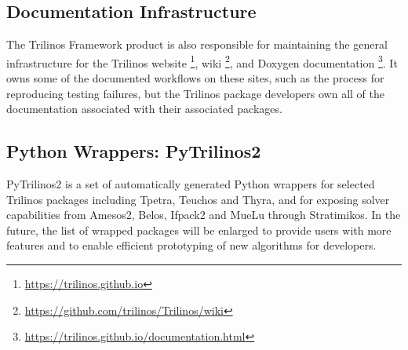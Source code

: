 \subsection{Documentation Infrastructure}

The Trilinos Framework product is also responsible for maintaining the general infrastructure for the Trilinos website \footnote{\url{https://trilinos.github.io}}, wiki \footnote{\url{https://github.com/trilinos/Trilinos/wiki}}, and Doxygen documentation \footnote{\url{https://trilinos.github.io/documentation.html}}. It owns some of the documented workflows on these sites, such as the process for reproducing testing failures, but the Trilinos package developers own all of the documentation associated with their associated packages.


\subsection{Python Wrappers: PyTrilinos2}

PyTrilinos2 is a set of automatically generated Python wrappers for selected Trilinos packages including Tpetra, Teuchos and Thyra, and for exposing solver capabilities from Amesos2, Belos, Ifpack2 and MueLu through Stratimikos. In the future, the list of wrapped packages will be enlarged to provide users with more features and to enable efficient prototyping of new algorithms for developers.

